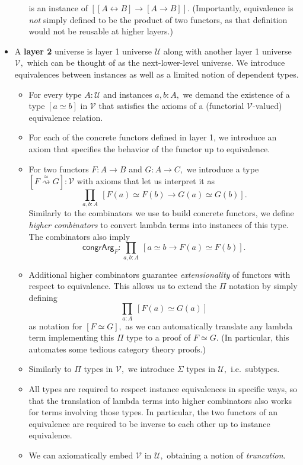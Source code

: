 \documentclass[a4paper]{article}
\theoremstyle{definition}
\theoremstyle{remark}
\newcommand{\defn}{\emph}
\renewcommand{\equiv}{\simeq}
\newcommand{\U}{\mathcal{U}}
\newcommand{\V}{\mathcal{V}}
\newcommand{\nm}{\mathsf}
\newcommand{\congrArg}{\nm{congrArg}}
\begin{document}
\begin{itemize}
\begin{itemize}
    is an instance of $[[A \leftrightarrow B] \to [A \to B]].$
    (Importantly, equivalence is \emph{not} simply defined to be the product of two functors, as
    that definition would not be reusable at higher layers.)
  \end{itemize}
  \item A \textbf{layer 2} universe is layer 1 universe $\U$ along with another layer 1 universe
  $\V,$ which can be thought of as the next-lower-level universe. We introduce equivalences between
  instances as well as a limited notion of dependent types.
  \begin{itemize}
    \item For every type $A : \U$ and instances $a,b : A,$ we demand the existence of a type
    $[a \equiv b]$ in $\V$ that satisfies the axioms of a (functorial $\V$-valued) equivalence
    relation.
    \item For each of the concrete functors defined in layer 1, we introduce an axiom that specifies
    the behavior of the functor up to equivalence.
    \item For two functors $F : A \to B$ and $G : A \to C,$ we introduce a type
    $[F \overset{\equiv}{\rightsquigarrow} G] : \V$ with axioms that let us interpret it as
    \[\prod_{a,b : A}\:[F(a) \equiv F(b) \to G(a) \equiv G(b)].\]
    Similarly to the combinators we use to build concrete functors, we define
    \defn{higher combinators} to convert lambda terms into instances of this type. The combinators
    also imply
    \[\congrArg_F : \prod_{a,b : A}\:[a \equiv b \to F(a) \equiv F(b)].\]
    \item Additional higher combinators guarantee \defn{extensionality} of functors with respect to
    equivalence. This allows us to extend the $\Pi$ notation by simply defining
    \[\prod_{a : A}\:[F(a) \equiv G(a)]\]
    as notation for $[F \equiv G],$ as we can automatically translate any lambda term implementing
    this $\Pi$ type to a proof of $F \equiv G.$ (In particular, this automates some tedious category
    theory proofs.)
    \item Similarly to $\Pi$ types in $\V,$ we introduce $\Sigma$ types in $\U,$ i.e.\ subtypes.
    \item All types are required to respect instance equivalences in specific ways, so that the
    translation of lambda terms into higher combinators also works for terms involving those types.
    In particular, the two functors of an equivalence are required to be inverse to each other up
    to instance equivalence.
    \item We can axiomatically embed $\V$ in $\U,$ obtaining a notion of \defn{truncation}.

\end{itemize}
\end{itemize}
\end{document}
